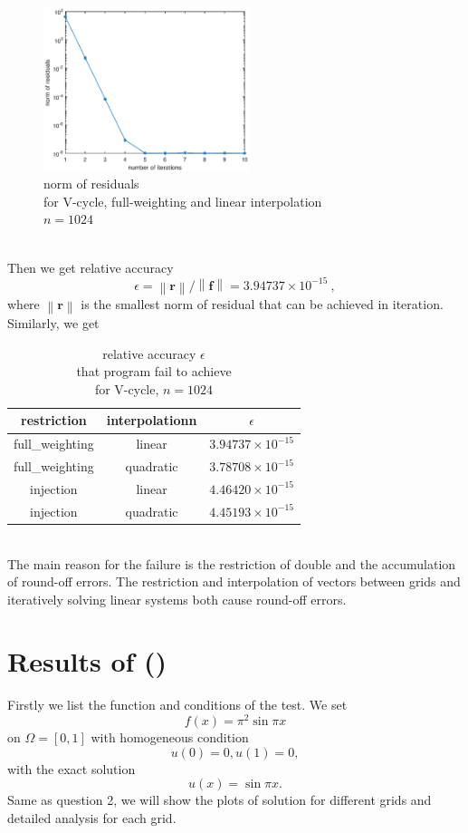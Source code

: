 \documentclass[a4paper,twocolumn]{article}
\theoremstyle{definition}
\begin{document}
\begin{figure}[!htp]   
	\centering
	\includegraphics[width=6cm]{Pictures/F3_1.eps}
	\caption{norm of residuals \\for V-cycle, full-weighting and linear interpolation\\ $n = 1024$}
\end{figure}\\
Then we get relative accuracy 
$$
\epsilon = \left \| \textbf{r} \right \| / \left \| \textbf{f} \right \| = 3.94737\times10^{-15} \ ,
$$ 
where $\left \| \textbf{r} \right \| $ is the smallest norm of residual that can be achieved in iteration. \\
Similarly, we get
\begin{table}[!htp]
	\centering
	\begin{tabular}{|c|c|c|}
		\hline	
		restriction&interpolationn  & $\epsilon$ \\
		\hline		
		full\_weighting&linear & $3.94737\times10^{-15}$ \\
		\hline		
		full\_weighting&quadratic & $3.78708\times 10^{-15}$ \\
		\hline		
		injection &linear& $4.46420\times 10^{-15}$ \\
		\hline		
		injection&quadratic & $4.45193\times 10^{-15}$ \\
		\hline
	\end{tabular}
	\caption{relative accuracy $\epsilon$ \\that program fail to achieve\\for V-cycle, $n = 1024$}
\end{table}\\
The main reason for the failure is the restriction of double and the accumulation of round-off errors. The restriction and interpolation of vectors between grids and iteratively solving linear systems both cause round-off errors.
\section{Results of (\uppercase\expandafter{})}
Firstly we list the function and conditions of the test.
We set 
$$
f(x) = \pi^2\sin \pi x 
$$
on $\Omega = [0,1]$ with homogeneous condition
$$
u(0) = 0,u(1) = 0 ,
$$
with the exact solution
$$
u(x) = \sin \pi x .
$$ 
Same as question 2, we will show the plots of solution for different grids and detailed analysis for each grid.
\end{document}
